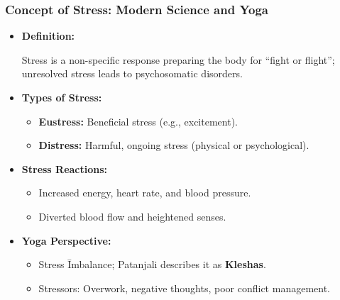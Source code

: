 \begin{frame}[fragile]\frametitle{Concept of Stress: Modern Science and Yoga}

    \begin{itemize}
        \item \textbf{Definition:}
        
        Stress is a non-specific response preparing the body for ``fight or flight''; unresolved stress leads to psychosomatic disorders.
        
        \item \textbf{Types of Stress:}
        \begin{itemize}
            \item \textbf{Eustress:} Beneficial stress (e.g., excitement).
            \item \textbf{Distress:} Harmful, ongoing stress (physical or psychological).
        \end{itemize}
        \item \textbf{Stress Reactions:}
        \begin{itemize}
            \item Increased energy, heart rate, and blood pressure.
            \item Diverted blood flow and heightened senses.
        \end{itemize}
        \item \textbf{Yoga Perspective:}
        \begin{itemize}
            \item Stress \= Imbalance; Patanjali describes it as \textbf{Kleshas}.
            \item Stressors: Overwork, negative thoughts, poor conflict management.
        \end{itemize}
    \end{itemize}

\end{frame}

